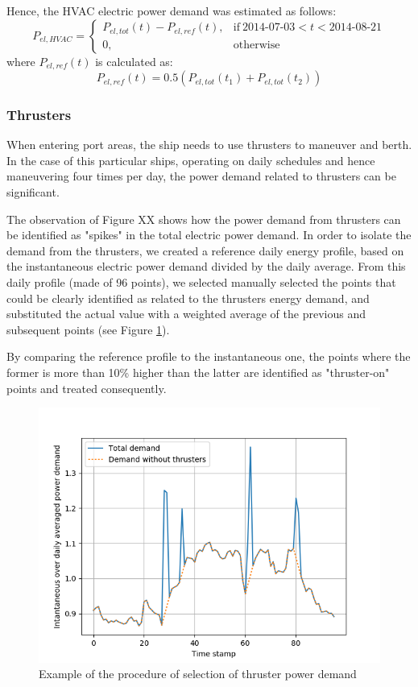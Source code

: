 \documentclass[preprint,12pt]{elsarticle}
\begin{document}
Hence, the HVAC electric power demand was estimated as follows:
\begin{equation}
P_{el,HVAC} =
\begin{cases}
P_{el,tot}(t) - P_{el,ref}(t) , & \text{if}\ \text{2014-07-03} < t < \text{2014-08-21} \\
0, & \text{otherwise}
\end{cases}
\end{equation}
where $P_{el,ref}(t)$ is calculated as:
\begin{equation}
	P_{el,ref}(t) = 0.5 (P_{el,tot}(t_1) + P_{el,tot}(t_2))
\end{equation}


\subsubsection*{Thrusters}

When entering port areas, the ship needs to use thrusters to maneuver and berth. In the case of this particular ships, operating on daily schedules and hence maneuvering four times per day, the power demand related to thrusters can be significant. 

The observation of Figure XX shows how the power demand from thrusters can be identified as "spikes" in the total electric power demand. In order to isolate the demand from the thrusters, we created a reference daily energy profile, based on the instantaneous electric power demand divided by the daily average. From this daily profile (made of 96 points), we selected manually selected the points that could be clearly identified as related to the thrusters energy demand, and substituted the actual value with a weighted average of the previous and subsequent points (see Figure \ref{fig:thruster_selection}). 

By comparing the reference profile to the instantaneous one, the points where the former is more than 10\% higher than the latter are identified as "thruster-on" points and treated consequently. 

\begin{figure}
	\centering
	\includegraphics[width=0.9\linewidth]{Figures/Thruster_selection}
	\caption{Example of the procedure of selection of thruster power demand}
	\label{fig:thruster_selection}
\end{figure}
\end{document}
